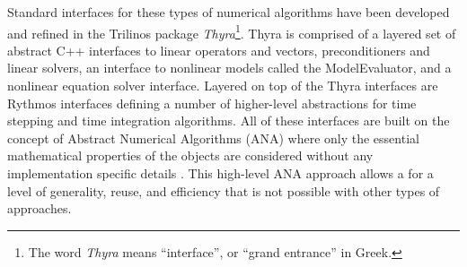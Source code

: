 \documentclass[pdf,ps2pdf,11pt]{SANDreport}
\begin{document}

Standard interfaces for these types of numerical algorithms have been developed
and refined in the Trilinos package {}\textit{Thyra}\footnote{The word
{}\textit{Thyra} means ``interface'', or ``grand entrance'' in Greek.}.  Thyra
is comprised of a layered set of abstract C++ interfaces to linear operators
and vectors, preconditioners and linear solvers, an interface to nonlinear
models called the ModelEvaluator, and a nonlinear equation solver interface.
Layered on top of the Thyra interfaces are Rythmos interfaces defining a
number of higher-level abstractions for time stepping and time integration
algorithms.  All of these interfaces are built on the concept of Abstract
Numerical Algorithms (ANA) where only the essential mathematical properties of
the objects are considered without any implementation specific details
{}\cite{ref:rtop_toms}.  This
high-level ANA approach allows a for a level of generality, reuse, and
efficiency that is not possible with other types of approaches.


\end{document}
